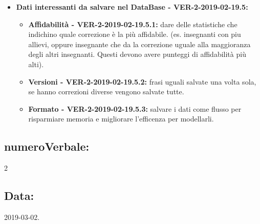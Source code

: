 \documentclass[a4paper, oneside, openany, dvipsnames, table]{article}
\begin{document}
\begin{itemize}
	\item \textbf{Dati interessanti da salvare nel DataBase - VER-2-2019-02-19.5:}
	\begin{itemize}
		\item \textbf{Affidabilità - VER-2-2019-02-19.5.1:} dare delle statistiche che indichino quale correzione è la più affidabile.
		(es. insegnanti con piu allievi, oppure insegnante che da la correzione uguale alla maggioranza degli 
		altri insegnanti. Questi devono avere punteggi di affidabilità più alti). 
		\item \textbf{Versioni - VER-2-2019-02-19.5.2:} frasi uguali salvate una volta sola, se hanno correzioni diverse vengono salvate tutte.
		\item \textbf{Formato - VER-2-2019-02-19.5.3:} salvare i dati come flusso per risparmiare memoria e migliorare l'efficenza per modellarli.
	\end{itemize}

\end{itemize}

\subsection{numeroVerbale:} 2

\subsection{Data:} 2019-03-02.
\end{document}
